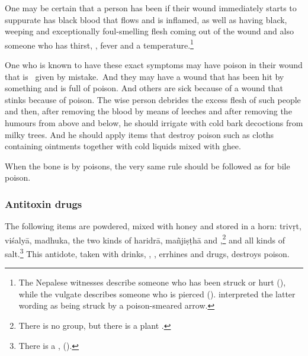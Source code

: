 \begin{translation}
\item [57--58ab]

    One may be certain that a person has been  if their wound immediately starts to suppurate
has black blood that flows and is inflamed, as well as having black,
weeping and exceptionally foul-smelling flesh coming out of the wound
and also someone who has thirst, , fever and a
temperature.\footnote{The Nepalese witnesses describe someone who has
    been struck or hurt (), while the vulgate describes
    someone who is pierced (). 
    interpreted the latter wording as being struck by a poison-smeared arrow.}

\item[58.1--60]

    
    One who is known to have these exact symptoms may have poison
    in their wound  that is \dag\ given by mistake.\dag\ And they may have 
    a wound that  has been hit by something
     and is full of poison. And others
    are sick because of a wound that stinks because of poison.  
    The wise person debrides the excess flesh of such people and then, after
    removing the blood by means of leeches and after removing the
    humours from above and below, he should irrigate with cold bark
    decoctions from milky trees.   And he should apply items that destroy poison 
    such as cloths containing 
    ointments together with cold liquids mixed with ghee.
        
    
\item[61ab]    

    When the bone is  by poisons, the very same rule should be 
    followed as for bile poison.

\subsubsection{Antitoxin drugs}

\item[61cd--63ab] 
The following items are powdered, mixed with honey and stored in a horn:
%
\gls{trivṛt}, \gls{viśalyā}, \gls{madhuka}, the two kinds of
\gls{haridrā}, \gls{mañjiṣṭhā} and ,\footnote{There
    is no  group, but there is a plant .} and all
    kinds of salt.\footnote{There is a ,
        ().}  This antidote, taken with drinks,
        , , errhines and drugs,
        destroys poison.


\end{translation}
